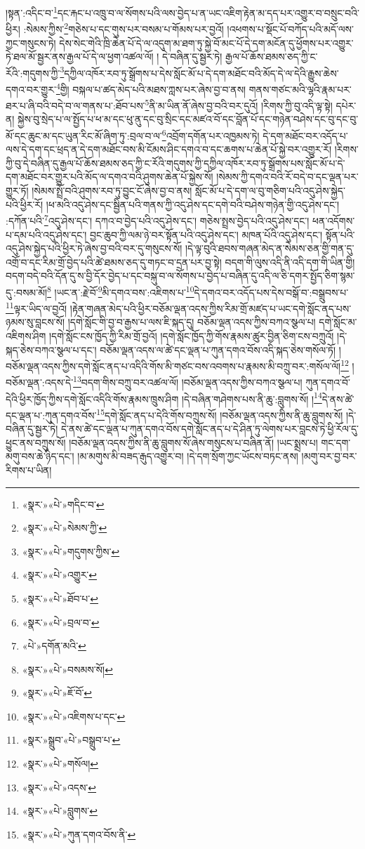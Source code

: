 །སྟན་:འདིང་བ་\footnote{«སྣར་»«པེ་»གདིང་བ་}དང་རྐང་པ་འཁྲུ་བ་ལ་སོགས་པའི་ལས་བྱེད་པ་ན་ཡང་འཇིག་རྟེན་མ་དད་པར་འགྱུར་བ་བསྲུང་བའི་ཕྱིར། :སེམས་ཀྱིས་\footnote{«སྣར་»«པེ་»སེམས་ཀྱི་}གཅེས་པ་དང་གུས་པར་བསམ་པ་གོམས་པར་བྱའོ། །འཕགས་པ་སྡོང་པོ་བཀོད་པའི་མདོ་ལས་ཀྱང་གསུངས་ཏེ། དེས་སེང་གེའི་ཁྲི་ཆེན་པོ་དེ་ལ་འདུག་མ་ཐག་ཏུ་སྐྱེ་བོ་མང་པོ་དེ་དག་མངོན་དུ་ཕྱོགས་པར་འགྱུར་ཏེ་ཐལ་མོ་སྦྱར་ནས་རྒྱལ་པོ་དེ་ལ་ཕྱག་འཚལ་ལོ། །
དེ་བཞིན་དུ་སྦྱར་ཏེ། རྒྱལ་པོ་ཆོས་ཐམས་ཅད་ཀྱི་ང་རོའི་:གདུགས་ཀྱི་\footnote{«སྣར་»«པེ་»གདུགས་ཀྱིས་}དཀྱིལ་འཁོར་རབ་ཏུ་སྒྲོགས་པ་དེས་སློང་མོ་པ་དེ་དག་མཐོང་བའི་མོད་དེ་ལ་དེའི་རྒྱུས་ཆེས་དགའ་བར་གྱུར་\footnote{«སྣར་»«པེ་»འགྱུར་}གྱི། བསྐལ་པ་ཚད་མེད་པའི་མཐས་ཀླས་པར་ཞེས་བྱ་བ་ནས། གནས་གཙང་མའི་ལྷའི་རྣམ་པར་ཐར་པ་ཞི་བའི་བདེ་བ་ལ་གནས་པ་:ཐོབ་པས་\footnote{«སྣར་»«པེ་»ཐོབ་པ་}ནི་མ་ཡིན་ནོ་ཞེས་བྱ་བའི་བར་དུའོ། །རིགས་ཀྱི་བུ་འདི་ལྟ་སྟེ། དཔེར་ན། སྐྱེས་བུ་སྲེད་པ་ལ་སྤྱོད་པ་ཕ་མ་དང་ཕུ་ནུ་དང་བུ་སྲིང་དང་མཛའ་བོ་དང་བློན་པོ་དང་གཉེན་བཤེས་དང་བུ་དང་བུ་མོ་དང་ཆུང་མ་དང་ཡུན་རིང་མོ་ཞིག་ཏུ་:བྲལ་བ་ལ་\footnote{«སྣར་»«པེ་»བྲལ་བ་}འབྲོག་དགོན་པར་འཁྱམས་ཏེ། དེ་དག་མཐོང་བར་འདོད་པ་ལས་དེ་དག་དང་ཕྲད་ན་དེ་དག་མཐོང་བས་མི་ངོམས་ཤིང་དགའ་བ་དང་ཆགས་པ་ཆེན་པོ་སྐྱེ་བར་འགྱུར་རོ། །རིགས་ཀྱི་བུ་དེ་བཞིན་དུ་རྒྱལ་པོ་ཆོས་ཐམས་ཅད་ཀྱི་ང་རོའི་གདུགས་ཀྱི་དཀྱིལ་འཁོར་རབ་ཏུ་སྒྲོགས་པས་སློང་མོ་པ་དེ་དག་མཐོང་བར་གྱུར་པའི་མོད་ལ་དགའ་བའི་ཤུགས་ཆེན་པོ་སྐྱེས་སོ། །སེམས་ཀྱི་དགའ་བའི་རོ་བདེ་བ་དང་ལྡན་པར་གྱུར་ཏོ། །སེམས་སྤྲོ་བའི་ཤུགས་རབ་ཏུ་བྱུང་ངོ་ཞེས་བྱ་བ་ནས། སློང་མོ་པ་དེ་དག་ལ་བུ་གཅིག་པའི་འདུ་ཤེས་སྐྱེད་པའི་ཕྱིར་རོ། །ཕ་མའི་འདུ་ཤེས་དང་སྦྱིན་པའི་གནས་ཀྱི་འདུ་ཤེས་དང་དགེ་བའི་བཤེས་གཉེན་གྱི་འདུ་ཤེས་དང་། :དཀོན་པའི་\footnote{«པེ་»དགོན་མའི་}འདུ་ཤེས་དང་། དཀའ་བ་བྱེད་པའི་འདུ་ཤེས་དང་། གཅེས་སྤྲས་བྱེད་པའི་འདུ་ཤེས་དང་། ཕན་འདོགས་པ་དམ་པའི་འདུ་ཤེས་དང་། བྱང་ཆུབ་ཀྱི་ལམ་ཉེ་བར་སྟོན་པའི་འདུ་ཤེས་དང་། མཁན་པོའི་འདུ་ཤེས་དང་། སྟོན་པའི་འདུ་ཤེས་སྐྱེད་པའི་ཕྱིར་ཏེ་ཞེས་བྱ་བའི་བར་དུ་གསུངས་སོ། །དེ་ལྟ་བུའི་ཐབས་གཞན་མེད་ན་སེམས་ཅན་གྱི་གན་དུ་འགྲོ་བ་དང་རིམ་གྲོ་བྱེད་པའི་ཚེ་ཐམས་ཅད་དུ་གཏང་བ་དྲན་པར་བྱ་སྟེ། བདག་གི་ལུས་འདི་ནི་འདི་དག་གི་ཡིན་གྱི། བདག་བདེ་བའི་དོན་དུ་ས་བྱི་དོར་བྱེད་པ་དང་བསྐུ་བ་ལ་སོགས་པ་བྱེད་པ་བཞིན་དུ་འདི་ལ་ཅི་དགར་སྤྱོད་ཅིག་སྙམ་དུ་:བསམ་མོ།\footnote{«སྣར་»«པེ་»བསམས་སོ།} །ཡང་ན་:རྗེ་བོ་\footnote{«སྣར་»«པེ་»ཇོ་བོ་}མི་དགའ་བས་:འཇིགས་པ་\footnote{«སྣར་»«པེ་»འཇིགས་པ་དང་}དེ་དགའ་བར་འདོད་པས་དེས་བསྒོ་བ་:བསྒྲུབས་པ་\footnote{«སྣར་»སྒྲུབ་«པེ་»བསྒྲུབ་པ་}ལྟར་ཡིད་ལ་བྱའོ། །རྟེན་གཞན་མེད་པའི་ཕྱིར་བཅོམ་ལྡན་འདས་ཀྱིས་རིམ་གྲོ་མཛད་པ་ཡང་དགེ་སློང་ནད་པས་ཉམས་སུ་བླངས་སོ། །དགེ་སློང་གི་བྱ་བ་རྒྱས་པ་ལས་ཇི་སྐད་དུ། བཅོམ་ལྡན་འདས་ཀྱིས་བཀའ་སྩལ་པ། དགེ་སློང་མ་འཇིགས་ཤིག །དགེ་སློང་ངས་ཁྱོད་ཀྱི་རིམ་གྲོ་བྱའོ། །དགེ་སློང་ཁྱོད་ཀྱི་གོས་རྣམས་ཚུར་བྱིན་ཅིག་ངས་བཀྲུའོ། །དེ་སྐད་ཅེས་བཀའ་སྩལ་པ་དང་། བཅོམ་ལྡན་འདས་ལ་ཚེ་དང་ལྡན་པ་ཀུན་དགའ་བོས་འདི་སྐད་ཅེས་གསོལ་ཏོ། །བཅོམ་ལྡན་འདས་ཀྱིས་དགེ་སློང་ནད་པ་འདིའི་གོས་མི་གཙང་བས་འབགས་པ་རྣམས་མི་བཀྲུ་བར་:གསོལ་ལོ།\footnote{«སྣར་»«པེ་»གསོལ།} །བཅོམ་ལྡན་:འདས་དེ་\footnote{«སྣར་»«པེ་»འདས་}བདག་གིས་བཀྲུ་བར་འཚལ་ལོ། །བཅོམ་ལྡན་འདས་ཀྱིས་བཀའ་སྩལ་པ། ཀུན་དགའ་བོ་དེའི་ཕྱིར་ཁྱོད་ཀྱིས་དགེ་སློང་འདིའི་གོས་རྣམས་ཁྲུས་ཤིག །དེ་བཞིན་གཤེགས་པས་ནི་ཆུ་:བླུགས་སོ། །\footnote{«སྣར་»«པེ་»བླུགས་}དེ་ནས་ཚེ་དང་ལྡན་པ་:ཀུན་དགའ་བོས་\footnote{«སྣར་»«པེ་»ཀུན་དགའ་བོས་ནི་}དགེ་སློང་ནད་པ་དེའི་གོས་བཀྲུས་སོ། །བཅོམ་ལྡན་འདས་ཀྱིས་ནི་ཆུ་བླུགས་སོ། །དེ་བཞིན་དུ་སྦྱར་ཏེ། དེ་ནས་ཚེ་དང་ལྡན་པ་ཀུན་དགའ་བོས་དགེ་སློང་ནད་པ་དེ་ཤིན་ཏུ་ལེགས་པར་བླངས་ཏེ་ཕྱི་རོལ་དུ་ཕྱུང་ནས་བཀྲུས་སོ། །བཅོམ་ལྡན་འདས་ཀྱིས་ནི་ཆུ་བླུགས་སོ་ཞེས་གསུངས་པ་བཞིན་ནོ། །ཡང་སྨྲས་པ། གང་དག་མགུ་བས་ཆེ་ཉིད་དང་། །མ་མགུས་མི་བཟད་རྒུད་འགྱུར་བ། །དེ་དག་སྲོག་ཀྱང་ཡོངས་བཏང་ནས། །མགུ་བར་བྱ་བར་རིགས་པ་ཡིན། 